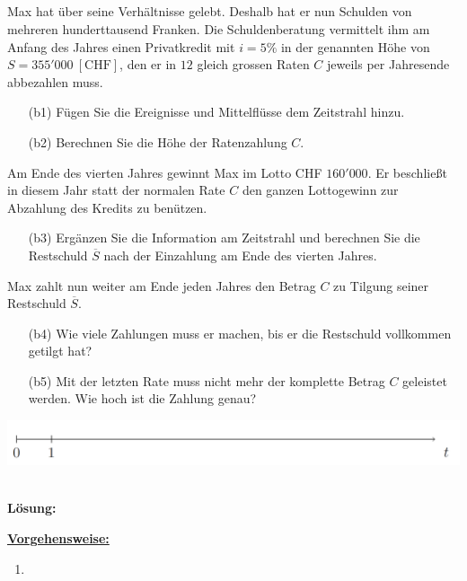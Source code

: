 \subsection*{}
Max hat über seine Verhältnisse gelebt. 
Deshalb hat er nun Schulden von mehreren hunderttausend Franken.
Die Schuldenberatung vermittelt ihm am Anfang des Jahres einen Privatkredit mit $ i = 5 \% $ in der genannten Höhe von $ S = 355'000 \ [\textrm{CHF}] $, den er in $ 12 $ gleich grossen Raten $ C $ jeweils per Jahresende abbezahlen muss. 
\begin{enumerate}
	\item[(b1)] Fügen Sie die Ereignisse und Mittelflüsse dem Zeitstrahl hinzu.
	\item[(b2)] Berechnen Sie die Höhe der Ratenzahlung $ C $.
\end{enumerate}
Am Ende des vierten Jahres gewinnt Max im Lotto CHF $ 160'000 $.
Er beschließt in diesem Jahr statt der normalen Rate $ C $ den ganzen Lottogewinn zur Abzahlung des Kredits zu benützen.
\begin{enumerate}
	\item[(b3)] Ergänzen Sie die Information am Zeitstrahl und berechnen Sie die Restschuld $ \overline{S} $ nach der Einzahlung am Ende des vierten Jahres.
\end{enumerate}
Max zahlt nun weiter am Ende jeden Jahres den Betrag $ C $ zu Tilgung seiner Restschuld $ \overline{S} $.
\begin{enumerate}
	\item[(b4)] Wie viele Zahlungen muss er machen, bis er die Restschuld vollkommen getilgt hat?
	\item[(b5)] Mit der letzten Rate muss nicht mehr der komplette Betrag $ C $ geleistet werden. Wie hoch ist die Zahlung genau?
\end{enumerate}
\begin{center}
	\includegraphics[scale=0.3]{pictures/zeitstrahl_1_b}
\end{center}
\ \\
\textbf{Lösung:}
\begin{mdframed}
\underline{\textbf{Vorgehensweise:}}
\begin{enumerate}
\item 
\end{enumerate}
\end{mdframed}

